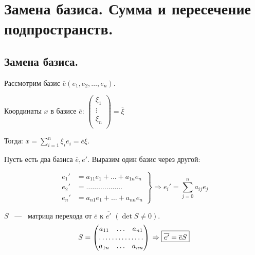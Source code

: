 \chapter{Замена базиса. Сумма и пересечение подпространств.}
\section{Замена базиса.}
Рассмотрим базис $\overline{e}(e_1,e_2,\dots,e_n)$.

Координаты $x$ в базисе $\overline{e}$: $ \begin{pmatrix}
\xi_1\\  
\vdots\\
\xi_n\\
\end{pmatrix} = \overline{\xi}$

\vspace{0.25cm}
Тогда: $x  = \sum\limits_{i=1}^n \xi_ie_i = \overline{e}\overline{\xi}$.
\vspace{5mm}

Пусть есть два базиса $\overline{e}, \overline{e'}$. Выразим один базис через другой:

\begin{equation*}
\left.
\begin{aligned}
e_1' &= a_{11}e_1 + \dots+ a_{1n}e_n\\
e_2' &= \dots\dots\dots\dots\dots\dots\\
e_n' &= a_{n1}e_1 + \dots  + a_{nn}e_n
\end{aligned} 
\right\} \Rightarrow e_i' = \sum\limits_{j=0}^n a_{ij}e_j \end{equation*}


\vspace{3mm}

$S$ ~---~ \textsf{матрица перехода} от $\overline{e}$ к $\overline{e'}$ $(\det S\neq 0).$
\begin{equation*}
\left.
\begin{aligned}S = \begin{pmatrix}
a_{11} & \dots & a_{n1}\\
\hdotsfor{3}\\
a_{1n} & \dots & a_{nn}\\
\end{pmatrix}
\end{aligned} 
\right. \Rightarrow \boxed{\overline{e'} = \overline{e}S}
\end{equation*}
\vspace{3mm}

